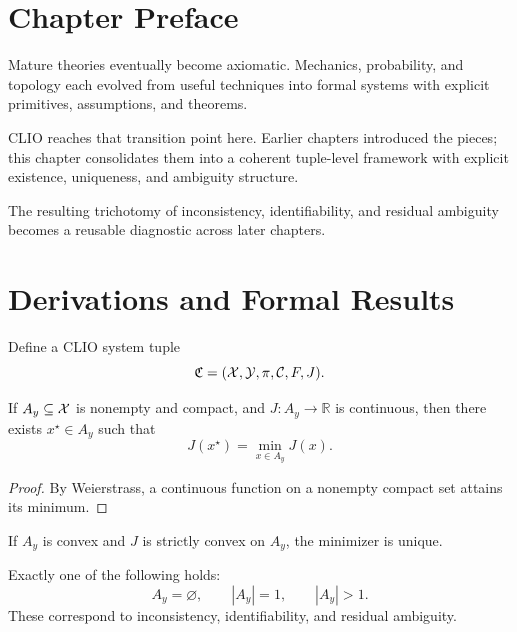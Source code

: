 \section{Chapter Preface}
Mature theories eventually become axiomatic. Mechanics, probability, and topology each evolved from useful techniques into formal systems with explicit primitives, assumptions, and theorems.

CLIO reaches that transition point here. Earlier chapters introduced the pieces; this chapter consolidates them into a coherent tuple-level framework with explicit existence, uniqueness, and ambiguity structure.

The resulting trichotomy of inconsistency, identifiability, and residual ambiguity becomes a reusable diagnostic across later chapters.

\section{Derivations and Formal Results}
Define a CLIO system tuple
\[
\mathfrak C=(\mathcal{X},\mathcal{Y},\pi,\mathcal{C},F,J).
\]

\begin{theorem}
If \(A_y\subseteq\mathcal{X}\) is nonempty and compact, and \(J:A_y\to\mathbb R\) is continuous, then there exists \(x^\star\in A_y\) such that
\[
J(x^\star)=\min_{x\in A_y}J(x).
\]
\end{theorem}

\begin{proof}
By Weierstrass, a continuous function on a nonempty compact set attains its minimum.
\end{proof}

\begin{proposition}
If \(A_y\) is convex and \(J\) is strictly convex on \(A_y\), the minimizer is unique.
\end{proposition}

\begin{theorem}
Exactly one of the following holds:
\[
A_y=\varnothing,\qquad |A_y|=1,\qquad |A_y|>1.
\]
These correspond to inconsistency, identifiability, and residual ambiguity.
\end{theorem}
